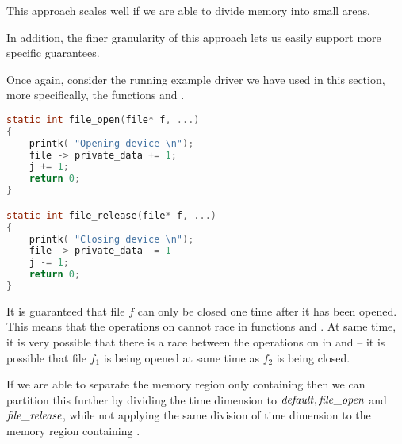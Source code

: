 \documentclass[..thesis.tex]{subfiles}
\begin{document}
This approach scales well if we are able to divide memory into small areas.



In addition, the finer granularity of this approach lets us easily support more specific guarantees.

Once again, consider the running example driver we have used in this section, more specifically, the functions  and .

\begin{lstlisting}[language=c,style=def]
static int file_open(file* f, ...)
{
    printk( "Opening device \n");
    file -> private_data += 1;
    j += 1;
    return 0;
}

static int file_release(file* f, ...)
{
    printk( "Closing device \n");
    file -> private_data -= 1
    j -= 1;
    return 0;
}
\end{lstlisting}

It is guaranteed that file $f$ can only be closed one time after it has been opened. This means that the operations on 
cannot race in functions  and . At same time, it is very possible that there is a race between the operations on  in  and 
-- it is possible that file $f_1$ is being opened at same time as $f_2$ is being closed. 

If we are able to separate the memory region only containing  then we can partition this further by dividing the time dimension to $\mathit{default}, \mathit{file\_open}$ and $\mathit{file\_release}$,
while not applying the same division of time dimension to the memory region containing . 
\end{document}
